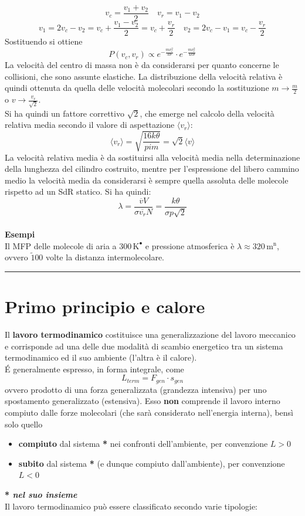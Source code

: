 \documentclass[10pt, oneside]{book}
\newcommand{\kelvin}[1]{\, \mathrm{K^{#1}}}
\newcommand{\meters}[2]{\, \mathrm{#2 m^{#1}}}
\newcommand{\mean}[1]{\langle #1 \rangle}
\newcommand{\infobox}[2]{\vspace{0.5cm}~\\ \textbf{#1} \hrulefill \vspace{0.2cm}\\#2 {}\,\\\hrule \vspace{0.5cm}}
\newcommand{\ds}{\displaystyle}
\begin{document}
\[v_c = \frac{v_1 + v_2}{2} \quad v_r = v_1 - v_2\]
\[v_1 = 2 v_c - v_2 = v_c + \frac{v_1 - v_2}{2}= v_c + \frac{v_r}{2} \quad v_2 = 2 v_c - v_1 = v_c - \frac{v_r}{2}\]
Sostituendo si ottiene
\[P(v_c, v_r) \propto e^{\displaystyle - \frac{m v_c^2}{k \theta}} \cdot e^{\displaystyle - \frac{m v_r^2}{4k \theta}}\]
La velocità del centro di massa non è da considerarsi per quanto concerne le collisioni, che sono assunte elastiche. La distribuzione della velocità relativa è quindi ottenuta da quella delle velocità molecolari secondo la sostituzione $\ds m \rightarrow \frac{m}{2}$ o $\ds v \rightarrow \frac{v_r}{\sqrt{2}}$.\\
Si ha quindi un fattore correttivo $\ds \sqrt{2}$, che emerge nel calcolo della velocità relativa media secondo il valore di aspettazione $\mean{v_r}$:
\[\mean{v_r} = \sqrt{\frac{16 k \theta}{pi m}}= \sqrt{2} \mean{v}\]
La velocità relativa media è da sostituirsi alla velocità media nella determinazione della lunghezza del cilindro costruito, mentre per l'espressione del libero cammino medio la velocità media da considerarsi è sempre quella assoluta delle molecole rispetto ad un SdR statico. Si ha quindi:
\[\lambda = \frac{\overline{v} V}{\sigma \overline{v_r} N} = \frac{k \theta}{\sigma p \sqrt{2}}\]
\infobox{Esempi}{Il MFP delle molecole di aria a $300 \kelvin{•}$ e pressione atmosferica è $\lambda \approx 320 \meters{n}{}$, ovvero $\tilde 100$ volte la distanza intermolecolare.}

\chapter{Primo principio e calore}
Il \textbf{lavoro termodinamico} costituisce una generalizzazione del lavoro meccanico e corrisponde ad una delle due modalità di scambio energetico tra un sistema termodinamico ed il suo ambiente (l'altra è il calore).\\
\'E generalmente espresso, in forma integrale, come
\[L_{term} = F_{gen} \cdot s_{gen}\]
ovvero prodotto di una forza generalizzata (grandezza intensiva) per uno spostamento generalizzato (estensiva). Esso \textbf{non} comprende il lavoro interno compiuto dalle forze molecolari (che sarà considerato nell'energia interna), bensì solo quello
\begin{itemize}
\item \textbf{compiuto} dal sistema \textbf{*} nei confronti dell'ambiente, per convenzione $L > 0$
\item \textbf{subito} dal sistema \textbf{*} (e dunque compiuto dall'ambiente), per convenzione $L < 0$ 
\end{itemize}
\textbf{* \textit{nel suo insieme}}\\
Il lavoro termodinamico può essere classificato secondo varie tipologie:
\end{document}
